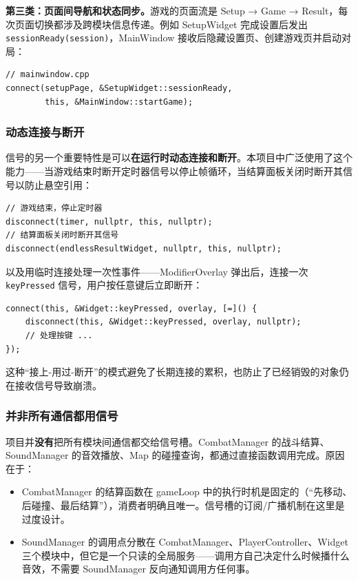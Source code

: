 \documentclass[utf8]{ctexart}
\begin{document}
\textbf{第三类：页面间导航和状态同步。}游戏的页面流是 Setup → Game → Result，每次页面切换都涉及跨模块信息传递。例如 SetupWidget 完成设置后发出 \texttt{sessionReady(session)}，MainWindow 接收后隐藏设置页、创建游戏页并启动对局：

\begin{verbatim}
// mainwindow.cpp
connect(setupPage, &SetupWidget::sessionReady,
        this, &MainWindow::startGame);
\end{verbatim}

\subsubsection{动态连接与断开}

信号的另一个重要特性是可以\textbf{在运行时动态连接和断开}。本项目中广泛使用了这个能力——当游戏结束时断开定时器信号以停止帧循环，当结算面板关闭时断开其信号以防止悬空引用：

\begin{verbatim}
// 游戏结束，停止定时器
disconnect(timer, nullptr, this, nullptr);
// 结算面板关闭时断开其信号
disconnect(endlessResultWidget, nullptr, this, nullptr);
\end{verbatim}

以及用临时连接处理一次性事件——ModifierOverlay 弹出后，连接一次 \texttt{keyPressed} 信号，用户按任意键后立即断开：

\begin{verbatim}
connect(this, &Widget::keyPressed, overlay, [=]() {
    disconnect(this, &Widget::keyPressed, overlay, nullptr);
    // 处理按键 ...
});
\end{verbatim}

这种“接上-用过-断开”的模式避免了长期连接的累积，也防止了已经销毁的对象仍在接收信号导致崩溃。

\subsubsection{并非所有通信都用信号}

项目并\textbf{没有}把所有模块间通信都交给信号槽。CombatManager 的战斗结算、SoundManager 的音效播放、Map 的碰撞查询，都通过直接函数调用完成。原因在于：

\begin{itemize}
  \item CombatManager 的结算函数在 gameLoop 中的执行时机是固定的（“先移动、后碰撞、最后结算”），消费者明确且唯一。信号槽的订阅/广播机制在这里是过度设计。
  \item SoundManager 的调用点分散在 CombatManager、PlayerController、Widget 三个模块中，但它是一个只读的全局服务——调用方自己决定什么时候播什么音效，不需要 SoundManager 反向通知调用方任何事。
\end{itemize}
\end{document}
